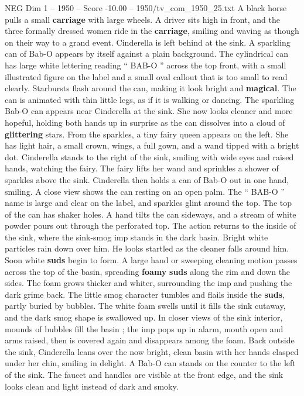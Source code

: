 \begin{textsample}{NEG Dim 1 – 1950 – Score -10.00 – 1950/tv\_com\_1950\_25.txt}
A black horse pulls a small \textbf{carriage} with large wheels.
A driver sits high in front, and the three formally dressed women ride in the \textbf{carriage}, smiling and waving as though on their way to a grand event.
Cinderella is left behind at the sink.
A sparkling can of Bab-O appears by itself against a plain background.
The cylindrical can has large white lettering reading “ BAB-O ” across the top front, with a small illustrated figure on the label and a small oval callout that is too small to read clearly.
Starbursts flash around the can, making it look bright and \textbf{magical}.
The can is animated with thin little legs, as if it is walking or dancing.
The sparkling Bab-O can appears near Cinderella at the sink.
She now looks cleaner and more hopeful, holding both hands up in surprise as the can dissolves into a cloud of \textbf{glittering} stars.
From the sparkles, a tiny fairy queen appears on the left.
She has light hair, a small crown, wings, a full gown, and a wand tipped with a bright dot.
Cinderella stands to the right of the sink, smiling with wide eyes and raised hands, watching the fairy.
The fairy lifts her wand and sprinkles a shower of sparkles above the sink.
Cinderella then holds a can of Bab-O out in one hand, smiling.
A close view shows the can resting on an open palm.
The “ BAB-O ” name is large and clear on the label, and sparkles glint around the top.
The top of the can has shaker holes.
A hand tilts the can sideways, and a stream of white powder pours out through the perforated top.
The action returns to the inside of the sink, where the sink-smog imp stands in the dark basin.
Bright white particles rain down over him.
He looks startled as the cleaner falls around him.
Soon white \textbf{suds} begin to form.
A large hand or sweeping cleaning motion passes across the top of the basin, spreading \textbf{foamy} \textbf{suds} along the rim and down the sides.
The foam grows thicker and whiter, surrounding the imp and pushing the dark grime back.
The little smog character tumbles and flails inside the \textbf{suds}, partly buried by bubbles.
The white foam swells until it fills the sink cutaway, and the dark smog shape is swallowed up.
In closer views of the sink interior, mounds of bubbles fill the basin ; the imp pops up in alarm, mouth open and arms raised, then is covered again and disappears among the foam.
Back outside the sink, Cinderella leans over the now bright, clean basin with her hands clasped under her chin, smiling in delight.
A Bab-O can stands on the counter to the left of the sink.
The faucet and handles are visible at the front edge, and the sink looks clean and light instead of dark and smoky.

\end{textsample}

